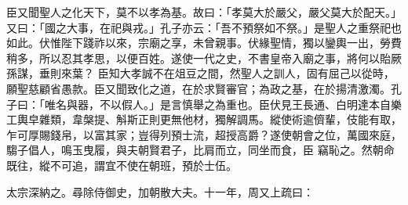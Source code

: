 \begin{pinyinscope}
 臣又聞聖人之化天下，莫不以孝為基。故曰：「孝莫大於嚴父，嚴父莫大於配天。」又曰：「國之大事，在祀與戎。」孔子亦云：「吾不預祭如不祭。」是聖人之重祭祀也如此。伏惟陛下踐祚以來，宗廟之享，未曾親事。伏緣聖情，獨以鑾輿一出，勞費稍多，所以忍其孝思，以便百姓。遂使一代之史，不書皇帝入廟之事，將何以貽厥孫謀，垂則來葉？
 臣知大孝誠不在俎豆之間，然聖人之訓人，固有屈己以從時，願聖慈顧省愚款。臣又聞致化之道，在於求賢審官；為政之基，在於揚清激濁。孔子曰：「唯名與器，不以假人。」是言慎舉之為重也。臣伏見王長通、白明達本自樂工輿皁雜類，韋槃提、斛斯正則更無他材，獨解調馬。縱使術逾儕輩，伎能有取，乍可厚賜錢帛，以富其家；豈得列預士流，超授高爵？遂使朝會之位，萬國來庭，騶子倡人，鳴玉曳履，與夫朝賢君子，比肩而立，同坐而食，臣
 竊恥之。然朝命既往，縱不可追，謂宜不使在朝班，預於士伍。



 太宗深納之。尋除侍御史，加朝散大夫。十一年，周又上疏曰：




\end{pinyinscope}
